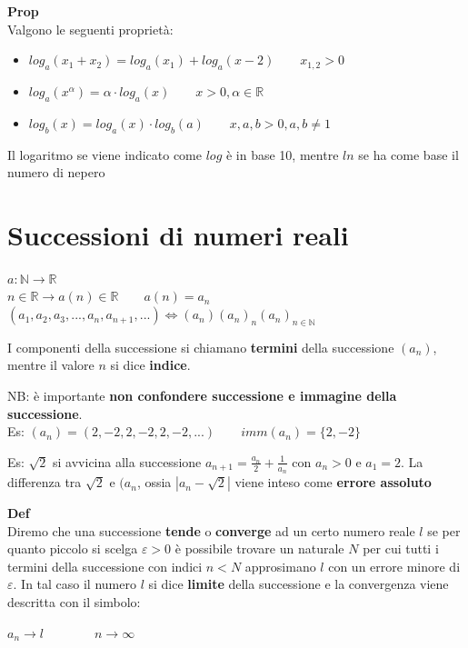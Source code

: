 \documentclass[12pt, a4paper]{article}
\begin{document}
\textbf{Prop}\\Valgono le seguenti proprietà:
\begin{itemize}
    \item $log_{a}(x_{1}+x_{2})=log_{a}(x_{1})+log_{a}(x-{2})\qquad x_{1,2}>0$
    \item $log_{a}(x^{\alpha})=\alpha\cdot log_{a}(x)\qquad x>0, \alpha\in\mathbb{R}$
    \item $log_{b}(x)=log_{a}(x)\cdot log_{b}(a)\qquad x,a,b>0,a,b\neq 1$
\end{itemize}
Il logaritmo se viene indicato come $log$ è in base 10, mentre $ln$ se ha come base il numero di nepero

\newpage
\section{Successioni di numeri reali}
\begin{center}
    $a:\mathbb{N}\rightarrow\mathbb{R}$\\
    $n\in\mathbb{R}\rightarrow a(n)\in\mathbb{R}\qquad a(n)=a_{n}$\\
    $(a_{1},a_{2},a_{3},...,a_{n},a_{n+1},...)\Leftrightarrow (a_{n})(a_{n})_{n}(a_{n})_{n\in\mathbb{N}}$
\end{center}
I componenti della successione si chiamano \textbf{termini} della successione $(a_{n})$, mentre il valore $n$ si
dice \textbf{indice}.

NB: è importante \textbf{non confondere successione e immagine della successione}.\\Es: $(a_{n})=
    (2,-2,2,-2,2,-2,...)\qquad imm(a_{n})=\{2,-2\}$

Es: $\sqrt{2}$ si avvicina alla successione $a_{n+1}=\frac{a_{n}}{2}+\frac{1}{a_{n}}$ con $a_{n}>0$ e $a_{1}=2$.
La differenza tra $\sqrt{2}$ e $(a_{n}$, ossia $|a_{n}-\sqrt{2}|$ viene inteso come \textbf{errore assoluto}

\textbf{Def}\\Diremo che una successione \textbf{tende} o \textbf{converge} ad un certo numero reale $l$ se per
quanto piccolo si scelga $\varepsilon >0$ è possibile trovare un naturale $N$ per cui tutti i termini della
successione con indici $n<N$ approsimano $l$ con un errore minore di $\varepsilon$. In tal caso il numero $l$
si dice \textbf{limite} della successione e la convergenza viene descritta con il simbolo:
\begin{center}
    $a_{n}\to l\qquad\qquad n\to\infty$
\end{center}
\end{document}
